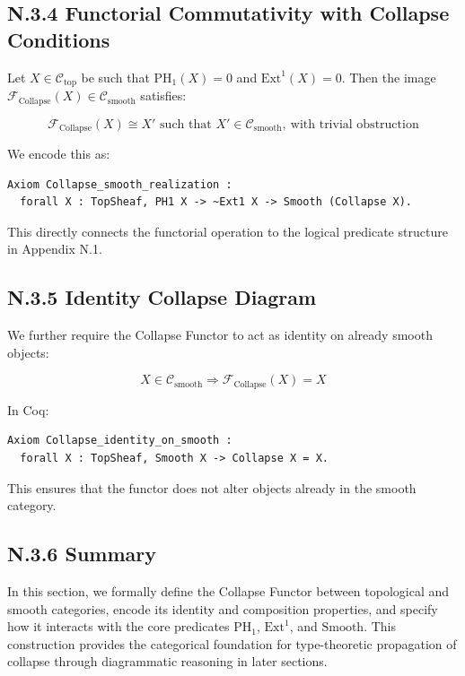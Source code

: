 \documentclass[11pt]{article}
\begin{document}
\subsection*{N.3.4 Functorial Commutativity with Collapse Conditions}

Let $X \in \mathcal{C}_{\mathrm{top}}$ be such that $\mathrm{PH}_1(X) = 0$ and $\mathrm{Ext}^1(X) = 0$.  
Then the image $\mathcal{F}_{\mathrm{Collapse}}(X) \in \mathcal{C}_{\mathrm{smooth}}$ satisfies:

\[
\mathcal{F}_{\mathrm{Collapse}}(X) \cong X' \text{ such that } X' \in \mathcal{C}_{\mathrm{smooth}},\ \text{with trivial obstruction}
\]

We encode this as:

\begin{verbatim}
Axiom Collapse_smooth_realization :
  forall X : TopSheaf, PH1 X -> ~Ext1 X -> Smooth (Collapse X).
\end{verbatim}

This directly connects the functorial operation to the logical predicate structure in Appendix N.1.

\subsection*{N.3.5 Identity Collapse Diagram}

We further require the Collapse Functor to act as identity on already smooth objects:

\[
X \in \mathcal{C}_{\mathrm{smooth}} \Rightarrow \mathcal{F}_{\mathrm{Collapse}}(X) = X
\]

In Coq:

\begin{verbatim}
Axiom Collapse_identity_on_smooth :
  forall X : TopSheaf, Smooth X -> Collapse X = X.
\end{verbatim}

This ensures that the functor does not alter objects already in the smooth category.

\subsection*{N.3.6 Summary}

In this section, we formally define the Collapse Functor between topological and smooth categories,  
encode its identity and composition properties, and specify how it interacts with the core predicates  
$\mathrm{PH}_1$, $\mathrm{Ext}^1$, and $\mathrm{Smooth}$. This construction provides the categorical  
foundation for type-theoretic propagation of collapse through diagrammatic reasoning in later sections.
\end{document}
